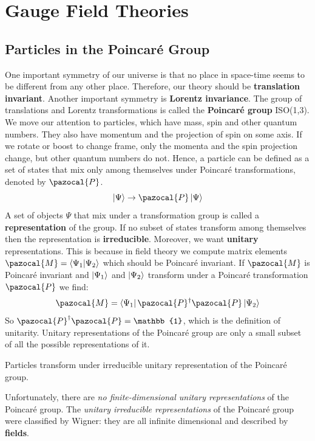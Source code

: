 \documentclass[../main.tex]{subfiles}
\begin{document}
\setchapterpreamble[u]{\margintoc}
\chapter[Gauge Field Theories]{Gauge Field Theories\footnotemark[0]}
\section{Particles in the Poincaré Group}
One important symmetry of our universe is that no place in space-time seems to be different from any other place. Therefore, our theory should be \textbf{translation invariant}. Another important symmetry is \textbf{Lorentz invariance}. The group of translations and Lorentz transformations is called the \textbf{Poincaré group} ISO(1,3).\\
We move our attention to particles, which have mass, spin and other quantum numbers. They also have momentum and the projection of spin on some axis. If we rotate or boost to change frame, only the momenta and the spin projection change, but other quantum numbers do not. Hence, a particle can be defined as a set of states that mix only among themselves under Poincaré transformations, denoted by $\pazocal{P}$.
\[
\ket{\Psi}\to\pazocal{P}\ket{\Psi}
\]
A set of objects $\Psi$ that mix under a transformation group is called a \textbf{representation} of the group. If no subset of states transform among themselves then the representation is \textbf{irreducible}. Moreover, we want \textbf{unitary} representations. This is because in field theory we compute matrix elements $\pazocal{M}=\bra{\Psi_1}\ket{\Psi_2}$ which should be Poincaré invariant. If $\pazocal{M}$ is Poincaré invariant and $\ket{\Psi_1}$ and $\ket{\Psi_2}$ transform under a Poincaré transformation $\pazocal{P}$ we find:
\[
\pazocal{M}=\bra{\Psi_1}\pazocal{P}^\dagger\pazocal{P}\ket{\Psi_2}
\]
So $\pazocal{P}^\dagger\pazocal{P}=\mathbb{1}$, which is the definition of unitarity. Unitary representations of the Poincaré group are only a small subset of all the possible representations of it. 
\begin{definition}
Particles transform under irreducible unitary representation of the Poincaré group.
\end{definition}
Unfortunately, there are \textit{no finite-dimensional unitary representations} of the Poincaré group. The \textit{unitary irreducible representations} of the Poincaré group were classified by Wigner: they are all infinite dimensional and described by \textbf{fields}.
\end{document}
